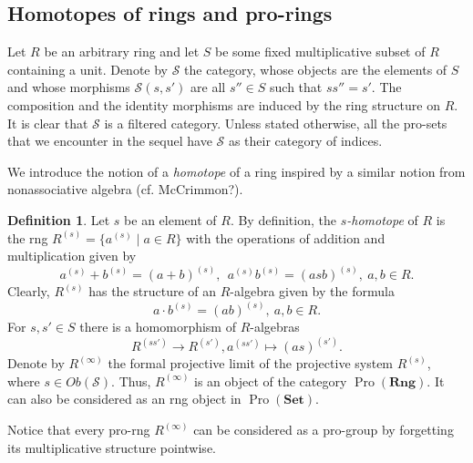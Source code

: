 \documentclass{article}
\numberwithin{equation}{section}
\theoremstyle{definition}
\newtheorem{df}[lemma]{Definition} \Crefname{df}{Definition}{Definitions}
\theoremstyle{remark}
\DeclareMathOperator{\Pro}{Pro}
\newcommand{\Set}{\mathbf{Set}}
\newcommand{\Rng}{\mathbf{Rng}}
\begin{document}
\subsection{Homotopes of rings and pro-rings}
Let $R$ be an arbitrary ring and let \(S\) be some fixed multiplicative subset of $R$ containing a unit. Denote by $\mathcal{S}$ the category, whose objects are the elements of \(S\) and whose morphisms \(\mathcal{S}(s, s')\) are all \(s'' \in S\) such that \(ss'' = s'\). The composition and the identity morphisms are induced by the ring structure on $R$. It is clear that $\mathcal{S}$ is a filtered category. Unless stated otherwise, all the pro-sets that we encounter in the sequel have \(\mathcal S\) as their category of indices.

We introduce the notion of a {\it homotope} of a ring inspired by a similar notion from nonassociative algebra (cf. McCrimmon?). 
\begin{df} \label{ring-homotope}
 Let $s$ be an element of $R$.  
 By definition, the {\it \(s\)-homotope} of \(R\) is the rng \(R^{(s)} = \{a^{(s)} \mid a \in R\}\) with the operations of addition and multiplication given by
 \[ a^{(s)} + b^{(s)} = (a + b)^{(s)},\ \ a^{(s)} b^{(s)} = (asb)^{(s)},\ a, b\in R.\]
 Clearly, $R^{(s)}$ has the structure of an \(R\)-algebra given by the formula \[a \cdot b^{(s)} = (ab)^{(s)},\ a, b \in R.\] For \(s, s' \in S\) there is a homomorphism of \(R\)-algebras \[R^{(ss')} \to R^{(s')}, a^{(ss')} \mapsto (as)^{(s')}.\]
 Denote by \(R^{(\infty)}\) the formal projective limit of the projective system \(R^{(s)}\), where \(s \in Ob(\mathcal S)\).
 Thus, $R^{(\infty)}$ is an object of the category $\Pro(\Rng)$. 
 It can also be considered as an rng object in \(\Pro(\Set)\).  
\end{df}

Notice that every pro-rng $R^{(\infty)}$ can be considered as a pro-group by forgetting its multiplicative structure pointwise.
\end{document}
